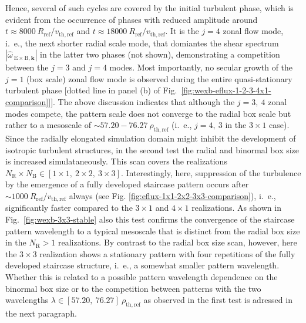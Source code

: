 \documentclass[aip, amsmath, amssymb, reprint, twocolumn]{revtex4-1}
\newcommand{\hatwexbkvec}{\widehat{\omega}_{\mathrm{\:E \times B},\mathbf{k}}}
\newcommand{\NR}{N_\mathrm{R}}
\newcommand{\NB}{N_\mathrm{B}}
\newcommand{\vthref}{v_\mathrm{th,ref}}
\newcommand{\Rref}{R_\mathrm{ref}}
\newcommand{\rhothref}{\rho_\mathrm{th,ref}}
\begin{document}
Hence, several of such cycles are covered by the initial turbulent phase, which is evident from the occurrence of phases with reduced amplitude around $t \approx 8000~\Rref/\vthref$ and $t \approx 18000~\Rref/\vthref$.
It is the $j = 4$ zonal flow mode, i.~e., the next shorter radial scale mode, that domiantes the shear spectrum $|\hatwexbkvec|$ in the latter two phases (not shown), demonstrating a competition between the $j = 3$ and $j = 4$ modes.
Most importantly, no secular growth of the $j = 1$ (box scale) zonal flow mode is observed during the entire quasi-stationary turbulent phase [dotted line in panel (b) of Fig.~\ref{fig:wexb-eflux-1-2-3-4x1-comparison}]].
The above discussion indicates that although the $j = 3,~4$ zonal modes compete, the pattern scale does not converge to the radial box scale but rather to a mesoscale of $\sim 57.20 - 76.27~\rhothref$ (i.~e., $j = 4,~3$ in the $3\times1$ case). \\

Since the radially elongated simulation domain might inhibit the development of isotropic turbulent structures, in the second test the radial and binormal box size is increased simulataneously.
This scan covers the realizations $\NR\times\NB \in [1\times1,~2\times2,~3\times3]$.
Interestingly, here, suppression of the turbulence by the emergence of a fully developed staircase pattern occurs after $\sim 1000~\Rref/\vthref$ always (see Fig. \ref{fig:eflux-1x1-2x2-3x3-comparison}), i.~e., significantly faster compared to the $3\times1$ and $4\times1$ realizations. 
%
As shown in Fig.~\ref{fig:wexb-3x3-stable} also this test confirms the convergence of the staircase pattern wavelength to a typical mesoscale that is distinct from the radial box size in the $\NR > 1$ realizations. 
By contrast to the radial box size scan, however, here the $3\times3$ realization shows a stationary pattern with four repetitions of the fully developed staircase structure, i.~e., a somewhat smaller pattern wavelength. 
Whether this is related to a possible pattern wavelength dependence on the binormal box size or to the competition between patterns with the two wavelengths $\lambda \in [57.20,~ 76.27]~\rhothref$ as observed in the first test is adressed in the next paragraph. \bigskip
\end{document}
